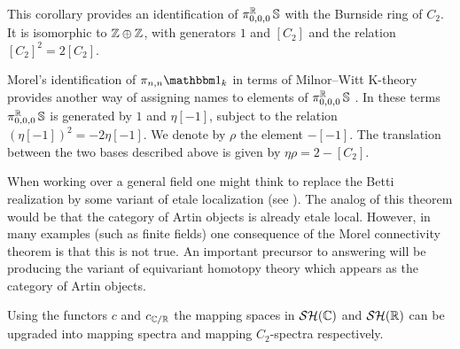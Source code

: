 \begin{rmk}
  This corollary provides an identification of $\pi_{0,0,0}^{\mathbb{R}}\operatorname{\mathbb{S}}$ with the Burnside ring of $C_2$.
  It is isomorphic to $\mathbb{Z} \oplus \mathbb{Z}$, with generators $1$ and $[C_2]$ and the relation $[C_2]^2 = 2[C_2]$.

  Morel's identification of $\pi_{n,n}\o_k$ in terms of Milnor--Witt K-theory provides another way of assigning names to elements of $\pi^{\mathbb{R}}_{0,0,0}\operatorname{\mathbb{S}}$ \cite{Morelpizero}.
  In these terms $\pi_{0,0,0}^{\mathbb{R}}\operatorname{\mathbb{S}}$ is generated by $1$ and $\eta [-1]$, subject to the relation $(\eta [-1])^2 = -2 \eta [-1]$. We denote by $\rho$ the element $-[-1]$.
  The translation between the two bases described above is given by $\eta \rho = 2 - [C_2]$.
\end{rmk}



\begin{rmk}
  When working over a general field one might think to replace the Betti realization by some variant of etale localization (see \cite{EldenJay}). The analog of this theorem would be that the category of Artin objects is already etale local.
  However, in many examples (such as finite fields) one consequence of the Morel connectivity theorem \cite{MorelConn} is that this is not true. An important precursor to answering  will be producing the variant of equivariant homotopy theory which appears as the category of Artin objects.
\end{rmk}
  
\begin{rmk}
  Using the functors $c$ and $c_{\mathbb{C}/\mathbb{R}}$ the mapping spaces in $\mathcal{SH}(\mathbb{C})$ and $\mathcal{SH}(\mathbb{R})$ can be upgraded into mapping spectra and mapping $C_2$-spectra respectively. %
\end{rmk}

